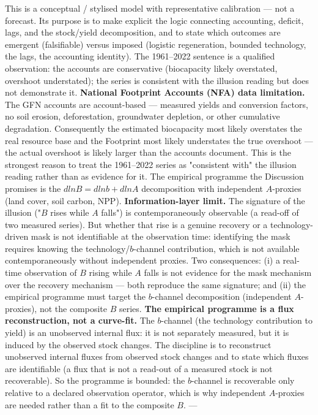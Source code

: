 \documentclass[11pt]{article}
\begin{document}
This is a conceptual / stylised model with representative calibration — not a forecast. Its purpose is to make explicit the logic connecting accounting, deficit, lags, and the stock/yield decomposition, and to state which outcomes are emergent (falsifiable) versus imposed (logistic regeneration, bounded technology, the lags, the accounting identity). The 1961–2022 sentence is a qualified observation: the accounts are conservative (biocapacity likely overstated, overshoot understated); the series is consistent with the illusion reading but does not demonstrate it. \textbf{National Footprint Accounts (NFA) data limitation.} The GFN accounts are account-based — measured yields and conversion factors, no soil erosion, deforestation, groundwater depletion, or other cumulative degradation. Consequently the estimated biocapacity most likely overstates the real resource base and the Footprint most likely understates the true overshoot — the actual overshoot is likely larger than the accounts document. This is the strongest reason to treat the 1961–2022 series as "consistent with" the illusion reading rather than as evidence for it. The empirical programme the Discussion promises is the $d ln B = d ln b + d ln A$ decomposition with independent $A$-proxies (land cover, soil carbon, NPP). \textbf{Information-layer limit.} The signature of the illusion ("$B$ rises while $A$ falls") is contemporaneously observable (a read-off of two measured series). But whether that rise is a genuine recovery or a technology-driven mask is not identifiable at the observation time: identifying the mask requires knowing the technology/$b$-channel contribution, which is not available contemporaneously without independent proxies. Two consequences: (i) a real-time observation of $B$ rising while $A$ falls is not evidence for the mask mechanism over the recovery mechanism — both reproduce the same signature; and (ii) the empirical programme must target the $b$-channel decomposition (independent $A$-proxies), not the composite $B$ series. \textbf{The empirical programme is a flux reconstruction, not a curve-fit.} The $b$-channel (the technology contribution to yield) is an unobserved internal flux: it is not separately measured, but it is induced by the observed stock changes. The discipline is to reconstruct unobserved internal fluxes from observed stock changes and to state which fluxes are identifiable (a flux that is not a read-out of a measured stock is not recoverable). So the programme is bounded: the $b$-channel is recoverable only relative to a declared observation operator, which is why independent $A$-proxies are needed rather than a fit to the composite $B$. ---
\end{document}
